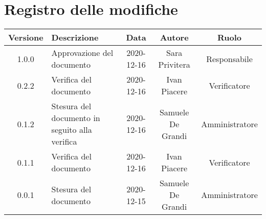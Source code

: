 \section*{Registro delle modifiche}

\begin{center}
	\begin{longtable}{|c|p{5cm}|c|c|c|}
	\hline
	\rowcolor{lighter-grayer}
	\textbf{Versione} & \textbf{Descrizione} & \textbf{Data} & \textbf{Autore} & \textbf{Ruolo} \\
	\hline
	\endfirsthead


	\hline
	1.0.0 & Approvazione del documento & 2020-12-16 & Sara Privitera & Responsabile \\
	\hline
	0.2.2 & Verifica del documento & 2020-12-16 & Ivan Piacere & Verificatore \\
	\hline
	0.1.2 & Stesura del documento in seguito alla verifica & 2020-12-16 & Samuele De Grandi & Amministratore \\
	\hline
	0.1.1 & Verifica del documento & 2020-12-16 & Ivan Piacere & Verificatore \\
	\hline
	0.0.1 & Stesura del documento & 2020-12-15 & Samuele De Grandi & Amministratore \\
	\hline
    
	\end{longtable}
\end{center}
